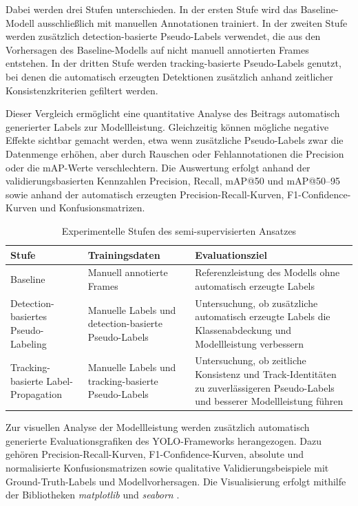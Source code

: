 Dabei werden drei Stufen unterschieden. In der ersten Stufe wird das
Baseline-Modell ausschließlich mit manuellen Annotationen trainiert. In der zweiten
Stufe werden zusätzlich detection-basierte Pseudo-Labels verwendet, die aus den
Vorhersagen des Baseline-Modells auf nicht manuell annotierten Frames entstehen.
In der dritten Stufe werden tracking-basierte Pseudo-Labels genutzt, bei denen die
automatisch erzeugten Detektionen zusätzlich anhand zeitlicher Konsistenzkriterien
gefiltert werden.

Dieser Vergleich ermöglicht eine quantitative Analyse des Beitrags automatisch
generierter Labels zur Modellleistung. Gleichzeitig können mögliche negative
Effekte sichtbar gemacht werden, etwa wenn zusätzliche Pseudo-Labels zwar die
Datenmenge erhöhen, aber durch Rauschen oder Fehlannotationen die Precision
oder die mAP-Werte verschlechtern. Die Auswertung erfolgt anhand der
validierungsbasierten Kennzahlen Precision, Recall, mAP@50 und mAP@50--95
sowie anhand der automatisch erzeugten Precision-Recall-Kurven,
F1-Confidence-Kurven und Konfusionsmatrizen.

\begin{table}[H]
    \centering
    \caption{Experimentelle Stufen des semi-supervisierten Ansatzes}
    \label{tab:iteration_comparison}
    \begin{tabular}{p{2.6cm}p{4.7cm}p{6.0cm}}
        \hline
        \textbf{Stufe}                                       & \textbf{Trainingsdaten} & \textbf{Evaluationsziel}                       \\
        \hline
        Baseline                                             &
        Manuell annotierte Frames                            &
        Referenzleistung des Modells ohne automatisch erzeugte Labels                                                                   \\
        \hline
        Detection-basiertes Pseudo-Labeling                  &
        Manuelle Labels und detection-basierte Pseudo-Labels &
        Untersuchung, ob zusätzliche automatisch erzeugte Labels die Klassenabdeckung und Modellleistung verbessern                     \\
        \hline
        Tracking-basierte Label-Propagation                  &
        Manuelle Labels und tracking-basierte Pseudo-Labels  &
        Untersuchung, ob zeitliche Konsistenz und Track-Identitäten zu zuverlässigeren Pseudo-Labels und besserer Modellleistung führen \\
        \hline
    \end{tabular}
\end{table}

Zur visuellen Analyse der Modellleistung werden zusätzlich automatisch generierte
Evaluationsgrafiken des YOLO-Frameworks herangezogen. Dazu gehören
Precision-Recall-Kurven, F1-Confidence-Kurven, absolute und normalisierte
Konfusionsmatrizen sowie qualitative Validierungsbeispiele mit Ground-Truth-Labels
und Modellvorhersagen. Die Visualisierung erfolgt mithilfe der Bibliotheken
\textit{matplotlib} und \textit{seaborn} \cite{hunter2007,waskom2021}.
